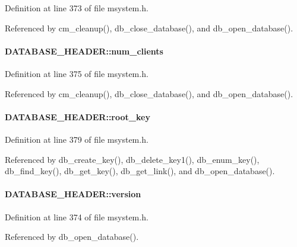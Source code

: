 Definition at line 373 of file msystem.h.

Referenced by cm\_\-cleanup(), db\_\-close\_\-database(), and db\_\-open\_\-database().
\paragraph[{num\_\-clients}]{ {\bf DATABASE\_\-HEADER::num\_\-clients}}\hfill\label{structDATABASE__HEADER_a1c234c63024d93ba67d75ea31260acc4}


Definition at line 375 of file msystem.h.

Referenced by cm\_\-cleanup(), db\_\-close\_\-database(), and db\_\-open\_\-database().
\paragraph[{root\_\-key}]{ {\bf DATABASE\_\-HEADER::root\_\-key}}\hfill\label{structDATABASE__HEADER_a7dcece0bdb6de90b680a1b01be4fb59d}


Definition at line 379 of file msystem.h.

Referenced by db\_\-create\_\-key(), db\_\-delete\_\-key1(), db\_\-enum\_\-key(), db\_\-find\_\-key(), db\_\-get\_\-key(), db\_\-get\_\-link(), and db\_\-open\_\-database().
\paragraph[{version}]{ {\bf DATABASE\_\-HEADER::version}}\hfill\label{structDATABASE__HEADER_a6f7e0a75b80833faf98128a6bc7c571e}


Definition at line 374 of file msystem.h.

Referenced by db\_\-open\_\-database().